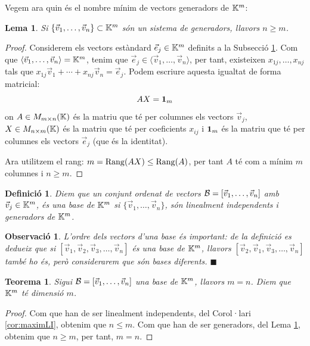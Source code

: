 \documentclass[
  11pt,
]{book}
\numberwithin{dummy}{section}
\theoremstyle{maincolornumbox}
\newtheorem{theorem}{TTTT}[chapter]
\newtheorem{theoremeT}{Teorema}[chapter]
\newtheorem{remarkT}{Observació}[chapter]
\theoremstyle{blacknumex}
\theoremstyle{blacknumbox}
\newtheorem{definitionT}{Definició}[chapter]
\theoremstyle{maincolornum}
\newtheorem{lemmaT}{Lema}[chapter]
\renewenvironment{theorem}{\begin{tBox}\begin{theoremeT}}{\end{theoremeT}\end{tBox}}
\newenvironment{lemma}{\begin{pBox}\begin{lemmaT}}{\end{lemmaT}\end{pBox}}
\newenvironment{definition}{\begin{dBox}\begin{definitionT}}{\end{definitionT}\end{dBox}}
\newenvironment{remark}{\begin{remarkT}}{\hfill{\tiny\ensuremath{\blacksquare}}\end{remarkT}}
\begin{document}
Vegem ara quin és el nombre mínim de vectors generadors de \(\mathbb{K}^m\):

\begin{lemma}
\protect\hypertarget{lem:genKn}{}\label{lem:genKn}Si
\(\{\vec v_1, \dots, \vec v_n\}\subset \mathbb{K}^m\) són un sistema de
generadors, llavors \(n\geq m\).
\end{lemma}

\begin{proof}
Considerem els vectors estàndard \(\vec e_j\in\mathbb{K}^m\) definits a
la Subsecció \protect\hyperlink{subsec:matriusapl}{1}. Com que
\(\langle \vec v_1, \dots, \vec v_n \rangle=\mathbb{K}^m\), tenim que
\(\vec e_j \in \langle \vec v_1, \dots, \vec v_n \rangle\), per tant,
existeixen \(x_{1j}, \dots, x_{nj}\) tals que
\(x_{1j} \vec v_1+ \cdots+x_{nj}\vec v_n=\vec e_j\). Podem escriure
aquesta igualtat de forma matricial: \[A X = \mathbf{1}_m\] on
\(A \in M_{m\times n}(\mathbb{K})\) és la matriu que té per columnes els vectors
\(\vec v_j\), \(X\in M_{n\times m}(\mathbb{K})\) és la matriu que té per coeficients
\(x_{ij}\) i \(\mathbf{1}_m\) és la matriu que té per columnes els vectors
\(\vec e_j\) (que és la identitat).

Ara utilitzem el rang: \(m=\operatorname{Rang}(AX)\leq\operatorname{Rang}(A)\), per tant \(A\) té com a
mínim \(m\) columnes i \(n\geq m\).
\end{proof}

\begin{definition}
\protect\hypertarget{def:base}{}\label{def:base}Diem que un conjunt ordenat de vectors
\(\mathcal{B}=[\vec v_1, \dots, \vec v_n]\) amb \(\vec v_j\in \mathbb{K}^m\), és \emph{una
base de \(\mathbb{K}^m\)} si \(\{\vec v_1,\dots,\vec v_n\}\), són linealment
independents i generadors de \(\mathbb{K}^m\).
\end{definition}

\begin{remark}
L'ordre dels vectors d'una base és important: de la definició es dedueix
que si \([\vec v_1, \vec v_2, \vec v_3,\dots, \vec v_n]\) és una base de
\(\mathbb{K}^m\), llavors \([\vec v_2, \vec v_1, \vec v_3,\dots, \vec v_n]\) també
ho és, però considerarem que són bases diferents.
\end{remark}

\begin{theorem}
Sigui \(\mathcal{B}=[\vec v_1, \dots, \vec v_n]\) una base de \(\mathbb{K}^m\), llavors
\(m=n\). Diem que \emph{\(\mathbb{K}^m\) té dimensió \(m\)}.
\end{theorem}

\begin{proof}
Com que han de ser linealment independents, del Corol·lari
\ref{cor:maximLI}, obtenim que \(n\leq m\). Com que han de ser
generadors, del Lema \ref{lem:genKn}, obtenim que \(n\geq m\), per tant, \(m=n\).
\end{proof}
\end{document}
